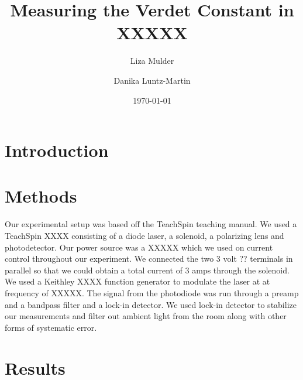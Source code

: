 \documentclass[prb,preprint]{revtex4-1}
\begin{document}

\title{Measuring the Verdet Constant in XXXXX}


\author{Liza Mulder}


\author{Danika Luntz-Martin}


\date{\today}

\begin{abstract}

\end{abstract}

\maketitle %


\section{Introduction} %

\section{Methods}

Our experimental setup was based off the TeachSpin teaching manual. We used a TeachSpin XXXX consisting of a diode laser, a solenoid, a polarizing lens and photodetector. Our power source was a XXXXX which we used on current control throughout our experiment. We connected the two 3 volt ??  terminals in parallel so that we could obtain a total current of 3 amps through the solenoid. We used a Keithley XXXX function generator to modulate the laser at at frequency of XXXXX. The signal from the photodiode was run through a preamp and a bandpass filter and a lock-in detector. We used lock-in detector to stabilize our measurements and filter out ambient light from the room along with other forms of systematic error. 

\section{Results}
\end{document}
